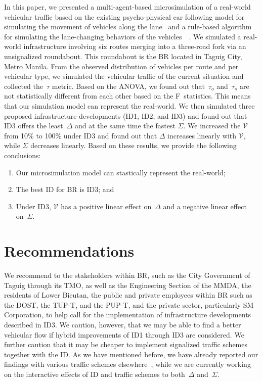 \documentclass[preprint]{./acm_proc_article-sp}
\begin{document}
In this paper, we presented a multi-agent-based microsimulation of a real-world vehicular traffic based on the existing psycho-physical car following model for simulating the movement of vehicles along the lane~\citep{fritzsche94,gipps81} and a rule-based algorithm for simulating the lane-changing behaviors of the vehicles~~\citep{alshihabi03,VISSIM90}. We simulated a real-world infrastructure involving six routes merging into a three-road fork via an unsignalized roundabout. This roundabout is the BR located in Taguig City, Metro Manila. From the observed distribution of vehicles per route and per vehicular type, we simulated the vehicular traffic of the current situation and collected the~$\tau$ metric. Based on the ANOVA, we found out that~$\tau_o$ and~$\tau_s$ are not statistically different from each other based on the F~statistics. This means that our simulation model can represent the real-world. We then simulated three proposed infrastructure developments (ID1, ID2, and ID3) and found out that ID3 offers the least~$\Delta$ and at the same time the fastest $\Sigma$. We increased the $\mathcal{V}$ from 10\% to 100\% under ID3 and found out that $\Delta$ increases linearly with $\mathcal{V}$, while $\Sigma$ decreases linearly. Based on these results, we provide the following conclusions:
\begin{enumerate}
\item Our microsimulation model can stastically represent the real-world;
\item The best ID for BR is ID3; and
\item Under ID3, $\mathcal{V}$ has a positive linear effect on~$\Delta$ and a negative linear effect on~$\Sigma$.
\end{enumerate}

\section{Recommendations}\label{sec:recommend}
We recommend to the stakeholders within BR, such as the City Government of Taguig through its TMO, as well as the Engineering Section of the MMDA, the residents of Lower Bicutan, the public and private employees within BR such as the DOST, the TUP-T, and the PUP-T, and the private sector, particularly SM Corporation, to help call for the implementation of infrastructure developments described in ID3. We caution, however, that we may be able to find a better vehicular flow if hybrid improvements of ID1 through ID3 are considered. We further caution that it may be cheaper to implement signalized traffic schemes together with the ID. As we have mentioned before, we have already reported our findings with various traffic schemes elsewhere~\cite{tataro13}, while we are currently working~\cite{arada14} on the interactive effects of ID and traffic schemes to both~$\Delta$ and~$\Sigma$.
\end{document}
